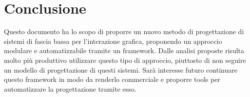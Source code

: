 \documentclass[journal]{IEEEtran}
\begin{document}
\section{Conclusione}

Questo documento ha lo scopo di proporre un nuovo metodo di progettazione di sistemi di fascia bassa per l'interazione grafica, proponendo un approccio modulare e automatizzabile tramite un framework. Dalle analisi proposte risulta molto più produttivo utilizzare questo tipo di approccio, piuttosto di non seguire un modello di progettazione di questi sistemi. Sarà interesse futuro continuare questo framework in modo da renderlo commerciale e proporre tools per automatizzare la progettazione tramite esso. 

\ifCLASSOPTIONcaptionsoff
  \newpage
\fi
\end{document}

